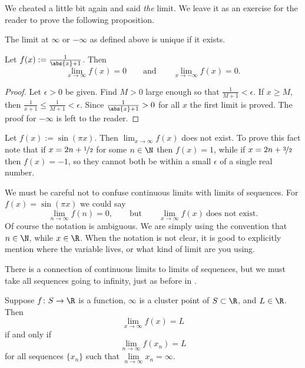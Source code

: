 \documentclass[12pt]{book}
\begin{document}
We cheated a little bit again and said \emph{the} limit.
We leave it as an exercise for the reader to prove the following proposition.

\begin{prop} \label{liminfty:unique}
The limit at $\infty$ or $-\infty$ as defined above is unique if it exists.
\end{prop}

\begin{example}
Let $f(x) := \frac{1}{\abs{x}+1}$.
Then
\begin{equation*}
\lim_{x\to \infty} f(x) = 0 \qquad \text{and} \qquad
\lim_{x\to -\infty} f(x) = 0 .
\end{equation*}

\begin{proof}
Let $\epsilon > 0$ be given.
Find $M > 0$ large enough
so that $\frac{1}{M+1} < \epsilon$.
If
$x \geq M$, then $\frac{1}{x+1} \leq \frac{1}{M+1} < \epsilon$.
Since $\frac{1}{\abs{x}+1} > 0$ for all $x$ the first limit is proved.
The proof for $-\infty$ is left to the reader.
\end{proof}
\end{example}

\begin{example}
Let $f(x) := \sin(\pi x)$.
Then $\lim_{x\to\infty} f(x)$ does not exist.
To prove this fact note that if $x = 2n+\nicefrac{1}{2}$ for some $n \in \N$ then $f(x)=1$,
while if $x = 2n+\nicefrac{3}{2}$ then $f(x)=-1$, so they cannot both be
within a small $\epsilon$ of a single real number.

We must be careful not to confuse continuous limits with limits of sequences.
For $f(x) = \sin(\pi x)$ we could say
\begin{equation*}
\lim_{n \to \infty} f(n) = 0, \qquad \text{but} \qquad
\lim_{x \to \infty} f(x) ~ \text{does not exist}.
\end{equation*}
Of course the notation is ambiguous.
We are simply using the convention
that $n \in \N$, while $x \in \R$.
When the notation is not clear,
it is good to explicitly mention where the variable lives, or what kind
of limit are you using.
\end{example}

There is a connection of continuous limits to limits of sequences, but we must take all
sequences going to infinity, just as before in .

\begin{lemma} \label{seqflimitinf:lemma}
Suppose $f \colon S \to \R$ is a function, $\infty$ is a cluster
point of $S \subset \R$, and $L \in \R$.
Then
\begin{equation*}
\lim_{x\to\infty} f(x) = L
\end{equation*}
if and only if
\begin{equation*}
\lim_{n\to\infty} f(x_n) = L%
\end{equation*}
for all sequences $\{ x_n \}$ such that $\lim\limits_{n\to\infty} x_n = \infty$.
\end{lemma}
\end{document}
